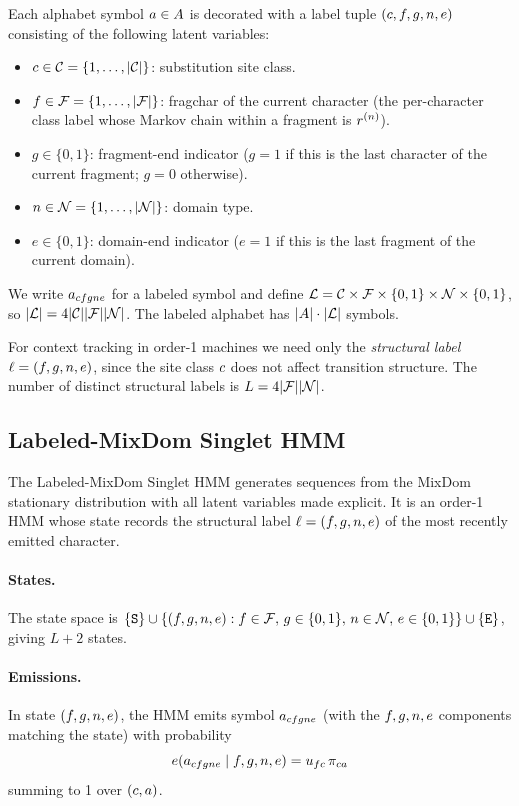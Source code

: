 Each alphabet symbol $a \in A$ is decorated with a label
tuple $(c, f, g, n, e)$ consisting of the following latent
variables:
\begin{itemize}
\item $c \in \mathcal{C} = \{1,\ldots,|\mathcal{C}|\}$: substitution site
class.
\item $f \in \mathcal{F} = \{1,\ldots,|\mathcal{F}|\}$: fragchar of the
current character (the per-character class label whose Markov chain
within a fragment is $r^{(n)}$).
\item $g \in \{0,1\}$: fragment-end indicator ($g=1$ if this is the
last character of the current fragment; $g=0$ otherwise).
\item $n \in \mathcal{N} = \{1,\ldots,|\mathcal{N}|\}$: domain type.
\item $e \in \{0,1\}$: domain-end indicator ($e=1$ if this is the
last fragment of the current domain).
\end{itemize}
We write $a_{cf gn e}$ for a labeled symbol and
define
$\mathcal{L} = \mathcal{C} \times \mathcal{F} \times \{0,1\} \times \mathcal{N} \times \{0,1\}$,
so $|\mathcal{L}| = 4 |\mathcal{C}| |\mathcal{F}| |\mathcal{N}|$. The labeled
alphabet has $|A| \cdot |\mathcal{L}|$ symbols.

For context tracking in order-1 machines we need only the
\emph{structural label} $\ell = (f, g, n, e)$, since the site
class $c$ does not affect transition structure. The number of
distinct structural labels is $L = 4 |\mathcal{F}| |\mathcal{N}|$.


\subsection{Labeled-MixDom Singlet HMM}
\label{sec:labeled-singlet}

The Labeled-MixDom Singlet HMM generates sequences from the MixDom stationary distribution
with all latent variables made explicit.
It is an order-1 HMM whose state records the structural label $\ell = (f, g, n, e)$
of the most recently emitted character.

\paragraph{States.}
The state space is $\{{\tt S}\} \cup \{(f, g, n, e) : f \in \mathcal{F},\, g \in \{0,1\},\, n \in \mathcal{N},\, e \in \{0,1\}\} \cup \{{\tt E}\}$,
giving $L + 2$ states.

\paragraph{Emissions.}
In state $(f, g, n, e)$, the HMM emits symbol $a_{cf gn e}$
(with the $f, g, n, e$ components matching the state) with probability
\begin{equation}
\label{eq:singlet-emit}
e(a_{cf gn e} \mid f, g, n, e)
= u_{fc}\, \pi_{ca}
\end{equation}
summing to 1 over $(c, a)$.

